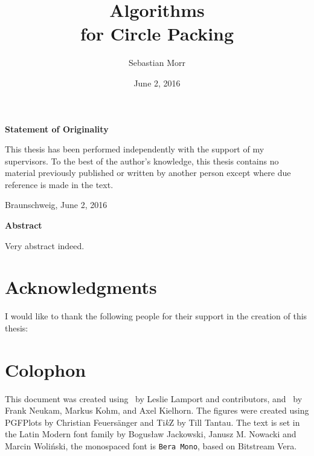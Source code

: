 \documentclass[%
    a4paper,              %
    style=screen,          %
    bibliography=totoc,   %
    nexus,                %
    lnum,                 %
    extramargin,          %
]{tubsbook}
\title{Algorithms\\for Circle Packing}
\author{\sffamily\LARGE Sebastian Morr}
\date{\large June 2, 2016}
\begin{document}
\frontmatter %

\maketitle
\cleardoublepage

\thispagestyle{plain} %
\vspace*{7cm}
\centerline{\bfseries Statement of Originality}
\vspace*{1em}
\noindent
This thesis has been performed independently with the support of my supervisors.
To the best of the author's knowledge, this thesis contains no material previously
published or written by another person except where due reference is made in the text.

\par
  \bigskip\noindent Braunschweig, June 2, 2016 \par
  \vspace*{10mm}
  \hfill\hrulefill
\cleardoublepage

\thispagestyle{plain} %
\centerline{\bfseries Abstract}
\vspace*{1em}
\noindent
Very abstract indeed.
\cleardoublepage

%

\section*{Acknowledgments}

I would like to thank the following people for their support in the creation of this thesis:

\section*{Colophon}

This document was created using \LaTeXe\ by Leslie Lamport and contributors, and \KOMAScript\ by Frank Neukam, Markus Kohm, and Axel Kielhorn. The figures were created using PGFPlots by Christian Feuersänger and Ti\textit{k}Z by Till Tantau. The text is set in the Latin Modern font family by Bogusław Jackowski, Janusz M. Nowacki and Marcin Woliński, the monospaced font is \texttt{Bera Mono}, based on Bitstream Vera.

\cleardoublepage
\setcounter{tocdepth}{2}

\tableofcontents
\cleardoublepage
\end{document}
